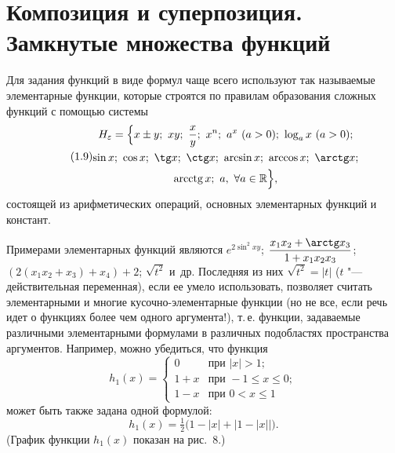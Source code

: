 \section{Композиция и суперпозиция. Замкнутые множества функций}

Для задания функций в виде формул чаще всего используют так называемые
элементарные функции, которые строятся по правилам образования сложных
функций с помощью системы
\begin{equation}\tag{1.9}
\begin{gathered}
H_\varepsilon=\Bigl\{x\pm y;\ xy;\ \frac xy;\ x^n;\ a^x\ (a>0);\ \log_ax\ (a>0);\\
\sin x;\ \cos x;\ \tg x;\ \ctg x;\ \arcsin x;\ \arccos x;\ \arctg x;\\
\operatorname{arcctg}x;\ a,\ \forall a\in\R\Bigr\},
\end{gathered}
\end{equation}
состоящей из арифметических операций, основных элементарных функций
и констант.

Примерами элементарных функций являются $e^{2\sin^2xy}$;
$\dfrac{x_1x_2+\arctg x_3}{1+x_1x_2x_3}$; $(2(x_1x_2+x_3)+x_4)+2$;
$\sqrt{t^2}$ и~др. Последняя из них $\sqrt{t^2}=|t|$ ($t$ "---
действительная переменная), если ее умело использовать, позволяет считать
элементарными и многие кусочно-элементарные функции (но не все, если речь
идет о функциях более чем одного аргумента!), т.\,е. функции, задаваемые
различными элементарными формулами в различных подобластях пространства
аргументов. Например, можно убедиться, что функция
\begin{equation}\tag{1.10}
h_1(x)=\begin{cases}0&\text{при }|x|>1;\\ 1+x&\text{при }-1\le x\le0;\\ 1-x&\text{при }0<x\le1\end{cases}
\end{equation}
может быть также задана одной формулой:
\[
h_1(x)=\tfrac12\bigl(1-|x|+|1-|x||\bigr).
\]
(График функции $h_1(x)$ показан на рис.~8.)

\begin{figure}[h]
\centering
{}
\end{figure}

